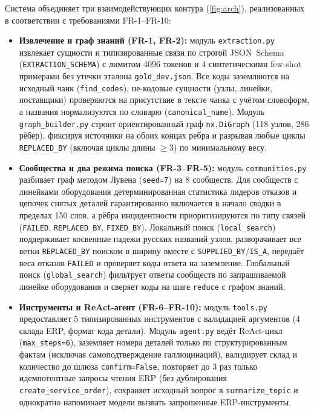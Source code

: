 \documentclass[a4paper,11pt]{article}
\begin{document}
Система объединяет три взаимодействующих контура (\cref{fig:arch}), реализованных в соответствии с требованиями FR-1--FR-10:
\begin{itemize}
  \item \textbf{Извлечение и граф знаний (FR-1, FR-2):} модуль \texttt{extraction.py} извлекает сущности и типизированные связи по строгой JSON~Schema (\texttt{EXTRACTION\_SCHEMA}) с лимитом \num{4096} токенов и \num{4} синтетическими few-shot примерами без утечки эталона \texttt{gold\_dev.json}. Все коды заземляются на исходный чанк (\texttt{find\_codes}), не-кодовые сущности (узлы, линейки, поставщики) проверяются на присутствие в тексте чанка с учётом словоформ, а названия нормализуются по словарю (\texttt{canonical\_name}). Модуль \texttt{graph\_builder.py} строит ориентированный граф \texttt{nx.DiGraph} (\num{118} узлов, \num{286} рёбер), фиксируя источники на обоих концах ребра и разрывая любые циклы \texttt{REPLACED\_BY} (включая циклы длины $\ge 3$) по минимальному весу.
  \item \textbf{Сообщества и два режима поиска (FR-3--FR-5):} модуль \texttt{communities.py} разбивает граф методом Лувена (\texttt{seed=7}) на \num{8} сообществ. Для сообществ с линейками оборудования детерминированная статистика лидеров отказов и цепочек снятых деталей гарантированно включается в начало сводки в пределах \num{150} слов, а рёбра инцидентности приоритизируются по типу связей (\texttt{FAILED}, \texttt{REPLACED\_BY}, \texttt{FIXED\_BY}). Локальный поиск (\texttt{local\_search}) поддерживает косвенные падежи русских названий узлов, разворачивает все ветки \texttt{REPLACED\_BY} поиском в ширину вместе с \texttt{SUPPLIED\_BY}/\texttt{IS\_A}, передаёт веса отказов \texttt{FAILED} и проверяет коды ответа на заземление. Глобальный поиск (\texttt{global\_search}) фильтрует ответы сообществ по запрашиваемой линейке оборудования и сверяет коды на шаге \texttt{reduce} с графом знаний.
  \item \textbf{Инструменты и ReAct-агент (FR-6--FR-10):} модуль \texttt{tools.py} предоставляет \num{5} типизированных инструментов с валидацией аргументов (\num{4} склада ERP, формат кода детали). Модуль \texttt{agent.py} ведёт ReAct-цикл (\texttt{max\_steps=6}), заземляет номера деталей только по структурированным фактам (исключая самоподтверждение галлюцинаций), валидирует склад и количество до шлюза \texttt{confirm=False}, повторяет до \num{3} раз только идемпотентные запросы чтения ERP (без дублирования \texttt{create\_service\_order}), сохраняет исходный вопрос в \texttt{summarize\_topic} и однократно напоминает модели вызвать запрошенные ERP-инструменты.
\end{itemize}
\end{document}

